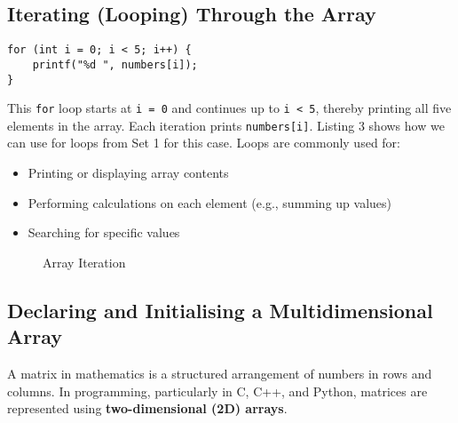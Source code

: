 \documentclass[a4paper,12pt]{article}
\begin{document}
\newpage

\subsection{Iterating (Looping) Through the Array}

\begin{lstlisting}[caption=Array Iteration]
for (int i = 0; i < 5; i++) {
    printf("%d ", numbers[i]);
}
\end{lstlisting}

This \texttt{for} loop starts at \texttt{i = 0} and continues up to \texttt{i < 5}, thereby printing all five elements in the array. Each iteration prints \verb|numbers[i]|. Listing 3 shows how we can use for loops from Set 1 for this case. Loops are commonly used for:

\begin{itemize}
  \item Printing or displaying array contents
  \item Performing calculations on each element (e.g., summing up values)
  \item Searching for specific values
\end{itemize}

\begin{figure}[H]
    \centering
    \caption{Array Iteration}
    \label{fig:enter-label}
\end{figure}

\subsection{Declaring and Initialising a Multidimensional Array}

A matrix in mathematics is a structured arrangement of numbers in rows and columns. In programming, particularly in C, C++, and Python, matrices are represented using \textbf{two-dimensional (2D) arrays}.
\end{document}
